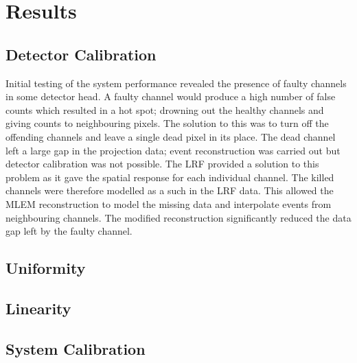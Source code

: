 \section{Results}
\subsection{Detector Calibration}
Initial testing of the system performance revealed the presence of faulty channels in some detector head. A faulty channel would produce a high number of false counts which resulted in a hot spot; drowning out the healthy channels and giving counts to neighbouring pixels. The solution to this was to turn off the offending channels and leave a single dead pixel in its place. The dead channel left a large gap in the projection data; event reconstruction was carried out but detector calibration was not possible. The \acrshort{LRF} provided a solution to this problem as it gave the spatial response for each individual channel. The killed channels were therefore modelled as a such in the \acrshort{LRF} data. This allowed the \acrshort{MLEM} reconstruction to model the missing data and interpolate events from neighbouring channels. The modified reconstruction significantly reduced the data gap left by the faulty channel. 

\subsection{Uniformity}
\subsection{Linearity} 
\subsection{System Calibration}

